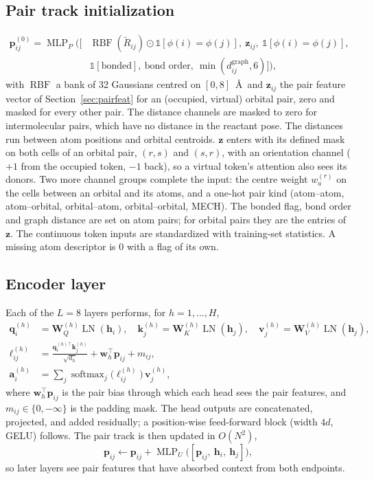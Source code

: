 \documentclass[11pt,a4paper]{article}
\newcommand{\vb}[1]{\bm{#1}}
\newcommand{\softmax}{\operatorname{softmax}}
\newcommand{\MLP}{\operatorname{MLP}}
\newcommand{\RBF}{\operatorname{RBF}}
\newcommand{\LN}{\operatorname{LN}}
\newcommand{\set}[1]{\{#1\}}
\begin{document}
\subsection{Pair track initialization}
\begin{equation}
\begin{split}
\vb{p}^{(0)}_{ij}=\MLP_P\Big(\big[&\RBF(\tilde R_{ij})\odot\mathbb{1}[\phi(i)=\phi(j)],\ \vb{z}_{ij},\ \mathbb{1}[\phi(i)=\phi(j)],\\
&\mathbb{1}[\text{bonded}],\ \text{bond order},\ \min(d^{\mathrm{graph}}_{ij},6)\big]\Big),
\end{split}
\end{equation}
with $\RBF$ a bank of 32 Gaussians centred on $[0,8]$~\AA\ and $\vb{z}_{ij}$ the pair feature vector of Section~\ref{sec:pairfeat} for an (occupied, virtual) orbital pair, zero and masked for every other pair. The distance channels are masked to zero for intermolecular pairs, which have no distance in the reactant pose. The distances run between atom positions and orbital centroids. $\vb{z}$ enters with its defined mask on both cells of an orbital pair, $(r,s)$ and $(s,r)$, with an orientation channel ($+1$ from the occupied token, $-1$ back), so a virtual token's attention also sees its donors. Two more channel groups complete the input: the centre weight $w^{(r)}_a$ on the cells between an orbital and its atoms, and a one-hot pair kind (atom--atom, atom--orbital, orbital--atom, orbital--orbital, MECH). The bonded flag, bond order and graph distance are set on atom pairs; for orbital pairs they are the entries of $\vb{z}$. The continuous token inputs are standardized with training-set statistics. A missing atom descriptor is $0$ with a flag of its own.

\subsection{Encoder layer}
Each of the $L=8$ layers performs, for $h=1,\dots,H$,
\begin{align}
\vb{q}^{(h)}_i&=\vb{W}^{(h)}_Q\LN(\vb{h}_i),\quad \vb{k}^{(h)}_j=\vb{W}^{(h)}_K\LN(\vb{h}_j),\quad \vb{v}^{(h)}_j=\vb{W}^{(h)}_V\LN(\vb{h}_j),\\
\ell^{(h)}_{ij}&=\frac{\vb{q}^{(h)\top}_i\vb{k}^{(h)}_j}{\sqrt{d_h}}
+\vb{w}_h^{\!\top}\vb{p}_{ij}
+ m_{ij},
\label{eq:logit}\\
\vb{a}^{(h)}_i&=\sum_j \softmax_j\big(\ell^{(h)}_{ij}\big)\,\vb{v}^{(h)}_j ,
\end{align}
where $\vb{w}_h^{\!\top}\vb{p}_{ij}$ is the pair bias through which each head sees the pair features, and $m_{ij}\in\set{0,-\infty}$ is the padding mask. The head outputs are concatenated, projected, and added residually; a position-wise feed-forward block (width $4d$, GELU) follows. The pair track is then updated in $O(N^2)$,
\begin{equation}
\vb{p}_{ij}\leftarrow\vb{p}_{ij}+\MLP_U\big([\vb{p}_{ij},\ \vb{h}_i,\ \vb{h}_j]\big),
\end{equation}
so later layers see pair features that have absorbed context from both endpoints.
\end{document}
